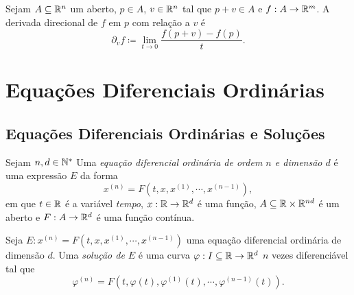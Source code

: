 \begin{defi}
	Sejam $A \subseteq \mathbb{R}^n$ um aberto, $p \in A$, $v \in \mathbb{R}^n$ tal que $p+v \in A$ e $f: A \to \mathbb{R}^m$. A derivada direcional de $f$ em $p$ com relação a $v$ é
	\begin{equation*}
	\partial_v f \coloneqq \lim_{t \to 0} \frac{f(p+v)-f(p)}{t}.
	\end{equation*}
\end{defi}






















\chapter{Equações Diferenciais Ordinárias}

\section{Equações Diferenciais Ordinárias e Soluções}

\begin{defi}
	Sejam $n,d \in \mathbb{N}^*$ Uma \emph{equação diferencial ordinária de ordem $n$ e dimensão $d$} é uma expressão $E$ da forma
	\begin{equation*}
	x^{(n)} = F(t, x, x^{(1)}, \cdots,x^{(n-1)}),
	\end{equation*}
em que $t \in \mathbb{R}$ é a variável \emph{tempo}, $x : \mathbb{R} \to \mathbb{R}^d$ é uma função, $A \subseteq \mathbb{R} \times \mathbb{R}^{nd}$ é um aberto e $F: A \to \mathbb{R}^d$ é uma função contínua.
\end{defi}

\begin{defi}
	Seja $E: x^{(n)} = F(t, x, x^{(1)}, \cdots,x^{(n-1)})$ uma equação diferencial ordinária de dimensão $d$. Uma \emph{solução de $E$} é uma curva $\varphi: I \subseteq \mathbb{R} \to \mathbb{R}^d$ $n$ vezes diferenciável tal que
	\begin{equation*}
	\varphi^{(n)} = F(t, \varphi(t), \varphi^{(1)}(t), \cdots,\varphi^{(n-1)}(t)).
	\end{equation*}
\end{defi}

